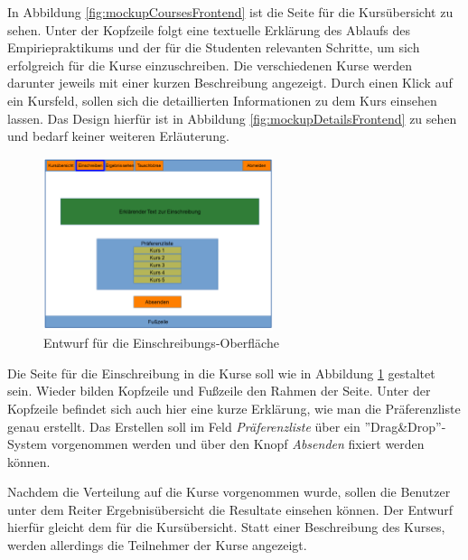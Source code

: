 			In Abbildung \ref{fig:mockupCoursesFrontend} ist die Seite für die Kursübersicht zu sehen.
            Unter der Kopfzeile folgt eine textuelle Erklärung des Ablaufs des Empiriepraktikums und der für die Studenten relevanten Schritte, um sich erfolgreich für die Kurse einzuschreiben.
            Die verschiedenen Kurse werden darunter jeweils mit einer kurzen Beschreibung angezeigt.
            Durch einen Klick auf ein Kursfeld, sollen sich die detaillierten Informationen zu dem Kurs einsehen lassen.
            Das Design hierfür ist in Abbildung \ref{fig:mockupDetailsFrontend} zu sehen und bedarf keiner weiteren Erläuterung.
            
            \begin{figure}[t]
            	\centering
            	\includegraphics[width=0.6\textwidth]{./design/images/MockUpsFrontend/frontendPreferences.png}
            	\caption{Entwurf für die Einschreibungs-Oberfläche}
            	\label{fig:mockupPreferencesFrontend}
            \end{figure}
            
            Die Seite für die Einschreibung in die Kurse soll wie in Abbildung \ref{fig:mockupPreferencesFrontend} gestaltet sein.
            Wieder bilden Kopfzeile und Fußzeile den Rahmen der Seite.
            Unter der Kopfzeile befindet sich auch hier eine kurze Erklärung, wie man die Präferenzliste genau erstellt.
            Das Erstellen soll im Feld \textit{Präferenzliste} über ein ''Drag\&Drop''-System vorgenommen werden und über den Knopf \textit{Absenden} fixiert werden können.
            
            Nachdem die Verteilung auf die Kurse vorgenommen wurde, sollen die Benutzer unter dem Reiter Ergebnisübersicht die Resultate einsehen können.
            Der Entwurf hierfür gleicht dem für die Kursübersicht.
            Statt einer Beschreibung des Kurses, werden allerdings die Teilnehmer der Kurse angezeigt.
            
